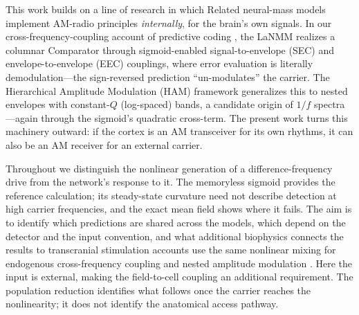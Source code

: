 \documentclass[11pt,a4paper]{article}
\providecommand{\DIFaddtex}[1]{{\protect\color{blue} \sf #1}} %
\providecommand{\DIFdeltex}[1]{{\protect\color{red} \scriptsize #1}} %
\providecommand{\DIFaddbegin}{} %
\providecommand{\DIFaddend}{} %
\providecommand{\DIFdelbegin}{} %
\providecommand{\DIFdelend}{} %
\providecommand{\DIFadd}[1]{\texorpdfstring{\DIFaddtex{#1}}{#1}} %
\providecommand{\DIFdel}[1]{\texorpdfstring{\DIFdeltex{#1}}{}} %
\begin{document}
\DIFdelbegin \DIFdel{This work builds on a line of research in which }\DIFdelend \DIFaddbegin \DIFadd{Related }\DIFaddend neural-mass \DIFdelbegin \DIFdel{models implement
AM-radio principles \emph{internally}, for the brain's own signals. In our
cross-frequency-coupling account of predictive coding \cite{ruffini2025cfc}, the
LaNMM realizes a columnar Comparator through sigmoid-enabled signal-to-envelope
(SEC) and envelope-to-envelope (EEC) couplings, where error evaluation is literally
demodulation---the sign-reversed prediction ``un-modulates'' the carrier. The
Hierarchical Amplitude Modulation (HAM) framework \cite{ruffini2025ham} generalizes
this to nested envelopes with constant-$Q$ (log-spaced) bands, a candidate origin of
$1/f$ spectra---again through the sigmoid's quadratic cross-term. The present work
turns this machinery outward: if the cortex is an AM transceiver for its own rhythms, it can also be an AM receiver for an external carrier. }%

\DIFdel{Throughout we distinguish the nonlinear generation of a difference-frequency drive from
the network's response to it. The memoryless sigmoid provides the reference calculation;
its steady-state curvature need not describe detection at high carrier frequencies, and
the exact mean field shows where it fails. The aim is to identify which predictions are
shared across the
models, which depend on the detector and the input convention, and what
additional biophysics connects the results to transcranial stimulation}\DIFdelend \DIFaddbegin \DIFadd{accounts use the same nonlinear mixing for endogenous
cross-frequency coupling and nested amplitude modulation
\cite{ruffini2025cfc,ruffini2025ham}. Here the input is external, making the
field-to-cell coupling an additional requirement. The population reduction identifies
what follows once the carrier reaches the nonlinearity; it does not identify the
anatomical access pathway}\DIFaddend .
\end{document}
